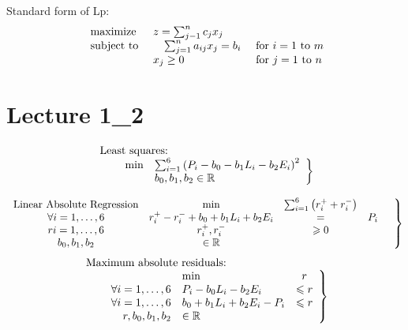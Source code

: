 \documentclass{article}
\begin{document}
Standard form of Lp:
$$
\begin{array} { l l l } { \text { maximize } } & { z = \sum _ { j - 1 } ^ { n } c _ { j } x _ { j } } \\ { \text { subject to } } & { \quad \sum _ { j = 1 } ^ { n } a _ { i j } x _ { j } = b _ { i } } & { \text { for } i = 1 \text { to } m } \\ { } & { x _ { j } \geq 0 } & { \text { for } j = 1 \text { to } n } \end{array}
$$
\section {Lecture 1\_2}
$$
\begin{array} { l } { \text { Least squares: } } \\ {\left. \qquad \begin{array} { r l } { \min } & { \sum _ { i = 1 } ^ { 6 } \left( P _ { i } - b _ { 0 } - b _ { 1 } L _ { i } - b _ { 2 } E _ { i } \right) ^ { 2 } } \\ { } & { b _ { 0 } , b _ { 1 } , b _ { 2 } \in \mathbb { R } } \end{array} \right\} } \end{array}
$$

$$
\left.\begin{array} { c c c c  c} { \text {Linear Absolute Regression} } & { \min } & { \sum _ { i = 1 } ^ { 6 } \left( r _ { i } ^ { + } + r _ { i } ^ { - } \right) } & { } & { } \\ { \forall i = 1 , \ldots , 6 } & { r _ { i } ^ { + } - r _ { i } ^ { - } + b _ { 0 } + b _ { 1 } L _ { i } + b _ { 2 } E _ { i } } & { = } & { P _ { i } } \\ { r i = 1 , \ldots , 6 } & { r _ { i } ^ { + } , r _ { i } ^ { - } } & { \geqslant 0 } \\ { b _ { 0 } , b _ { 1 } , b _ { 2 } } & { \in \mathbb { R } } \end{array} \right\}
$$
$$
\begin{array} { l } { \text { Maximum absolute residuals: } } \\ {\left. \qquad \begin{array} { r l  c} { } & { \min } &{r}\\ { \forall i = 1 , \ldots , 6 } & { P _ { i } - b _ { 0 } L _ { i } - b _ { 2 } E _ { i } } & { \leqslant r } \\ { \forall i = 1 , \ldots , 6 } & { b _ { 0 } + b _ { 1 } L _ { i } + b _ { 2 } E _ { i } - P _ { i } } & { \leqslant r } \\ { r , b _ { 0 } , b _ { 1 } , b _ { 2 } } & { \in \mathbb { R } } \end{array} \right\} } \end{array}
$$
\end{document}
